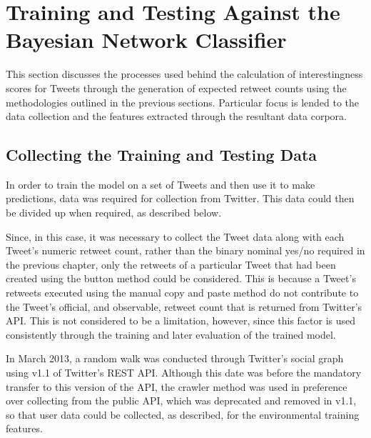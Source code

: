 \section{Training and Testing Against the Bayesian Network Classifier}
This section discusses the processes used behind the calculation of interestingness scores for Tweets through the generation of expected retweet counts using the methodologies outlined in the previous sections. Particular focus is lended to the data collection and the features extracted through the resultant data corpora.


\subsection{Collecting the Training and Testing Data}
In order to train the model on a set of Tweets and then use it to make predictions, data was required for collection from Twitter. This data could then be divided up when required, as described below.

Since, in this case, it was necessary to collect the Tweet data along with each Tweet's numeric retweet count, rather than the binary nominal yes/no required in the previous chapter, only the retweets of a particular Tweet that had been created using the button method could be considered. This is because a Tweet's retweets executed using the manual copy and paste method do not contribute to the Tweet's official, and observable, retweet count that is returned from Twitter's API. This is not considered to be a limitation, however, since this factor is used consistently through the training and later evaluation of the trained model.

In March 2013, a random walk was conducted through Twitter's social graph using v1.1 of Twitter's REST API. Although this date was before the mandatory transfer to this version of the API, the crawler method was used in preference over collecting from the public API, which was deprecated and removed in v1.1, so that user data could be collected, as described, for the environmental training features.


